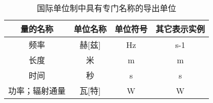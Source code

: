 \begin{denotation}
\begin{table}[h]%
\caption{国际单位制中具有专门名称的导出单位}
\vspace{0.5em}\centering\wuhao
\begin{tabular}{cccc}
\toprule[1.5pt]
量的名称&单位名称&单位符号&其它表示实例\\
\midrule[1pt]
频率&赫[兹]&Hz&s-1\\
长度&米&m&m\\
时间&秒&s&s\\
功率；辐射通量&瓦[特]&W&W\\


\bottomrule[1.5pt]
\end{tabular}
\end{table}
\end{denotation}
